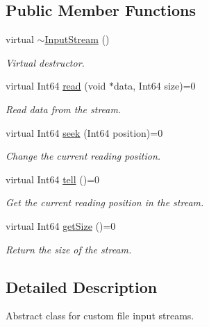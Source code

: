 \subsection*{Public Member Functions}
\begin{DoxyCompactItemize}
\item 
virtual \mbox{\hyperlink{classsf_1_1_input_stream_a4b2eb0f92323e630bd0542bc6191682e}{$\sim$\+Input\+Stream}} ()
\begin{DoxyCompactList}\small\item\em Virtual destructor. \end{DoxyCompactList}\item 
virtual Int64 \mbox{\hyperlink{classsf_1_1_input_stream_a8dd89c74c1acb693203f50e750c6ae53}{read}} (void $\ast$data, Int64 size)=0
\begin{DoxyCompactList}\small\item\em Read data from the stream. \end{DoxyCompactList}\item 
virtual Int64 \mbox{\hyperlink{classsf_1_1_input_stream_a76aba8e5d5cf9b1c5902d5e04f7864fc}{seek}} (Int64 position)=0
\begin{DoxyCompactList}\small\item\em Change the current reading position. \end{DoxyCompactList}\item 
virtual Int64 \mbox{\hyperlink{classsf_1_1_input_stream_a599515b9ccdbddb6fef5a98424fd559c}{tell}} ()=0
\begin{DoxyCompactList}\small\item\em Get the current reading position in the stream. \end{DoxyCompactList}\item 
virtual Int64 \mbox{\hyperlink{classsf_1_1_input_stream_a311eaaaa65d636728e5153b574b72d5d}{get\+Size}} ()=0
\begin{DoxyCompactList}\small\item\em Return the size of the stream. \end{DoxyCompactList}\end{DoxyCompactItemize}


\subsection{Detailed Description}
Abstract class for custom file input streams. 

\begin{DoxyVerb}\end{DoxyVerb}


